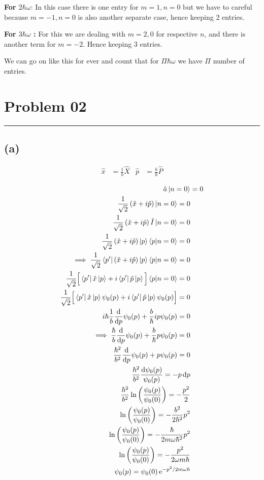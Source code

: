 \documentclass[letter, 10pts]{article}
\newcommand{\hb}{\hbar}
\begin{document}
\textbf{For $2 \hb \omega$}: 
In this case there is one entry for $m = 1, n = 0$ but we have to careful because $m  = - 1, n= 0$ is also another separate case, hence keeping 2 entries. 

\textbf{For $3 \hb \omega$ :  }
For this we are dealing with $ m= 2, 0$ for respective  $n$, and there is another term for $m = -2$. Hence keeping $3$ entries. 

We can go on like this for ever and count that for $\Pi \hb \omega$ we have $\Pi$ number of entries.

\newpage
\section*{Problem 02}
\hrule
\subsection*{(a)} 
\begin{align*}
\hat{x} &= \frac{1}{b} \hat{X} 
	&\hat{p} &= \frac{b}{\hb} \hat{P} \\
\end{align*}
\begin{align*}
	\hat{a} \ket{n = 0} &= 0 \\ 
	\frac{1}{\sqrt{2} }\left(\hat{x} + i \hat{p}\right) \ket{n = 0}= 0 \\
	\frac{1}{\sqrt{2} }\left( \hat{x} + i \hat{p}\right)\hat{I} \ket{n = 0}= 0 \\
	\frac{1}{\sqrt{2} }\left( \hat{x} + i \hat{p}\right)\ket{p} \braket{p | n=0}= 0 \\
	\implies
	\frac{1}{\sqrt{2} }\bra{p'}\left( \hat{x} + i \hat{p}\right)\ket{p} \braket{p | n=0}= 0 \\
	\frac{1}{\sqrt{2} }
	\Big[
		\bra{p'}\hat{x} \ket{p} + i \bra{p'}\hat{p}\ket{p}
	\Big] 
	\braket{p | n=0}= 0 \\
	\frac{1}{\sqrt{2} }
	\Big[
		\bra{p'}\hat{x} \ket{p} \psi_0(p) + i \bra{p'}\hat{p}\ket{p}
	\psi_0(p)
	\Big] = 0 \\
		i \hb \frac{1}{b} \frac{\mathrm{d} }{\mathrm{d} p} \psi_0(p) + 
\frac{b}{\hb}
		i p 
	\psi_0(p)
	= 0 \\
	\implies
		 \frac{\hb}{b} \frac{\mathrm{d} }{\mathrm{d} p} \psi_0(p) +  \frac{b}{\hb}p 
	\psi_0(p)
	= 0 \\
		 \frac{\hb^2}{b^2} \frac{\mathrm{d} }{\mathrm{d} p} \psi_0(p) +  p 
	\psi_0(p)
	= 0 \\
\frac{\hb^2}{b^2} \frac{\mathrm{d} \psi_0(p) }{\psi_0(p)} = - p \, \mathrm{d} p \\
\frac{\hb^2}{b^2} \ln \left(\frac{\psi_0(p)}{\psi_0(0)}\right)= - \frac{p^2}{2} \\
 \ln \left(\frac{\psi_0(p)}{\psi_0(0)}\right)= - \frac{b^2}{2 \hb^2 } p^2 \\
 \ln \left(\frac{\psi_0(p)}{\psi_0(0)}\right)= - \frac{\hb}{2 m \omega \hb^2 } p^2 \\
 \ln \left(\frac{\psi_0(p)}{\psi_0(0)}\right)= - \frac{p^2}{2  \omega  m \hb }  \\
 \psi_0(p) = \psi_0(0) \, \mathrm e^{- p^2 / 2 m \omega \hb }
\end{align*}
\end{document}
